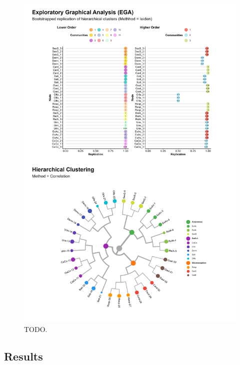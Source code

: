 \documentclass[
  jou,
  floatsintext,
  longtable,
  nolmodern,
  notxfonts,
  notimes,
  colorlinks=true,linkcolor=blue,citecolor=blue,urlcolor=blue]{apa7}
\begin{document}
\begin{figure}[!htbp]

{\caption{{TODO.}{\label{fig-two}}}}

\begin{center}
\includegraphics[width=1\linewidth,height=\textheight,keepaspectratio]{../study2/analysis/figures/fig1.png}
\end{center}

\end{figure}

\subsection{Results}\label{results-1}
\end{document}
